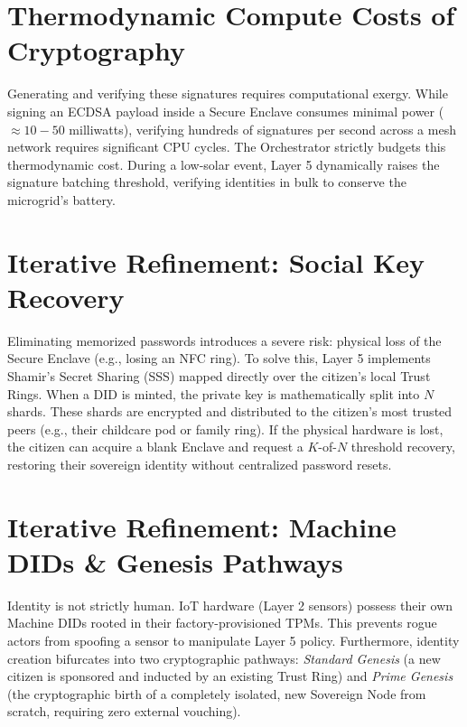 \section{Thermodynamic Compute Costs of Cryptography}
Generating and verifying these signatures requires computational exergy. While signing an ECDSA payload inside a Secure Enclave consumes minimal power ($\approx 10-50$ milliwatts), verifying hundreds of signatures per second across a mesh network requires significant CPU cycles. The Orchestrator strictly budgets this thermodynamic cost. During a low-solar event, Layer 5 dynamically raises the signature batching threshold, verifying identities in bulk to conserve the microgrid's battery.

\section{Iterative Refinement: Social Key Recovery}
Eliminating memorized passwords introduces a severe risk: physical loss of the Secure Enclave (e.g., losing an NFC ring). To solve this, Layer 5 implements Shamir's Secret Sharing (SSS) mapped directly over the citizen's local Trust Rings. When a DID is minted, the private key is mathematically split into $N$ shards. These shards are encrypted and distributed to the citizen's most trusted peers (e.g., their childcare pod or family ring). If the physical hardware is lost, the citizen can acquire a blank Enclave and request a $K$-of-$N$ threshold recovery, restoring their sovereign identity without centralized password resets.

\section{Iterative Refinement: Machine DIDs \& Genesis Pathways}
Identity is not strictly human. IoT hardware (Layer 2 sensors) possess their own Machine DIDs rooted in their factory-provisioned TPMs. This prevents rogue actors from spoofing a sensor to manipulate Layer 5 policy. Furthermore, identity creation bifurcates into two cryptographic pathways: \textit{Standard Genesis} (a new citizen is sponsored and inducted by an existing Trust Ring) and \textit{Prime Genesis} (the cryptographic birth of a completely isolated, new Sovereign Node from scratch, requiring zero external vouching).
